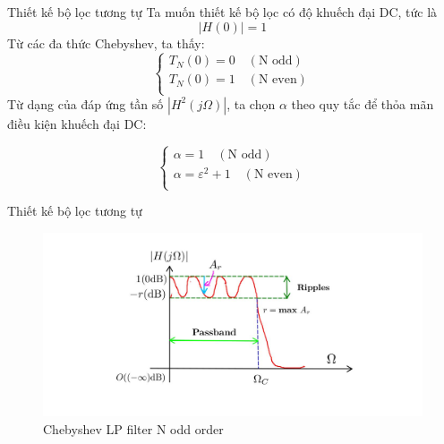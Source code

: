 \documentclass[8pt]{beamer}
\begin{document}
\begin{frame}{Thiết kế bộ lọc tương tự}
Ta muốn thiết kế bộ lọc có độ khuếch đại DC, tức là $$|H(0)|=1$$
Từ các đa thức Chebyshev, ta thấy:
\begin{equation*}
\begin{cases}
T_{N}(0)=0\quad(\text{N odd})\\
T_{N}(0)=1\quad(\text{N even})\\
\end{cases}
\end{equation*}
Từ dạng của đáp ứng tần số $|H^2(j\Omega)|$, ta chọn $\alpha$ theo quy tắc để thỏa mãn điều kiện khuếch đại DC:

\begin{equation*}
\begin{cases}
\alpha=1\quad(\text{N odd})\\
\alpha=\varepsilon^2+1\quad(\text{N even})\\
\end{cases}
\end{equation*}
\end{frame}
\begin{frame}{Thiết kế bộ lọc tương tự}
\begin{figure}[h]
	\includegraphics[width=1\textwidth]{16.jpg}
	\caption{Chebyshev LP filter N odd order}			\label{fig:re2}
		\end{figure}

\end{frame}
\end{document}
